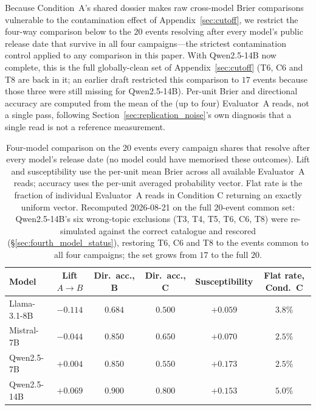 \documentclass[11pt,journal,onecolumn]{IEEEtran}
\begin{document}
Because Condition~A's shared dossier makes raw cross-model Brier comparisons vulnerable to the contamination effect of Appendix~\ref{sec:cutoff}, we restrict the four-way comparison below to the $20$ events resolving after every model's public release date that survive in all four campaigns---the strictest contamination control applied to any comparison in this paper. With Qwen2.5-14B now complete, this is the full globally-clean set of Appendix~\ref{sec:cutoff} (T6, C6 and T8 are back in it; an earlier draft restricted this comparison to $17$ events because those three were still missing for Qwen2.5-14B). Per-unit Brier and directional accuracy are computed from the mean of the (up to four) Evaluator~A reads, not a single pass, following Section~\ref{sec:replication_noise}'s own diagnosis that a single read is not a reference measurement.

\begin{table}[!htbp]
\centering
\caption{Four-model comparison on the $20$ events every campaign shares that resolve after every model's release date (no model could have memorised these outcomes). Lift and susceptibility use the per-unit mean Brier across all available Evaluator~A reads; accuracy uses the per-unit averaged probability vector. Flat rate is the fraction of individual Evaluator~A reads in Condition C returning an exactly uniform vector. Recomputed 2026-08-21 on the full $20$-event common set: Qwen2.5-14B's six wrong-topic exclusions (T3, T4, T5, T6, C6, T8) were re-simulated against the correct catalogue and rescored (\S\ref{sec:fourth_model_status}), restoring T6, C6 and T8 to the events common to all four campaigns; the set grows from $17$ to the full $20$.}
\label{tab:four_model_clean}
\small
\begin{tabular}{lccccc}
\toprule
\textbf{Model} & \textbf{Lift $A\!\to\!B$} & \textbf{Dir.\ acc., B} & \textbf{Dir.\ acc., C} & \textbf{Susceptibility} & \textbf{Flat rate, Cond.\ C} \\
\midrule
Llama-3.1-8B    & $-0.114$          & $0.684$          & $0.500$          & $+0.059$          & $3.8\%$ \\
Mistral-7B      & $-0.044$          & $0.850$          & $0.650$          & $+0.070$          & $\mathbf{2.5\%}$ \\
Qwen2.5-7B      & $+0.004$          & $0.850$          & $0.550$          & $\mathbf{+0.173}$ & $2.5\%$ \\
Qwen2.5-14B     & $\mathbf{+0.069}$ & $\mathbf{0.900}$ & $\mathbf{0.800}$ & $+0.153$          & $5.0\%$ \\
\bottomrule
\end{tabular}
\setlength{\tabcolsep}{6pt}
\end{table}
\end{document}
